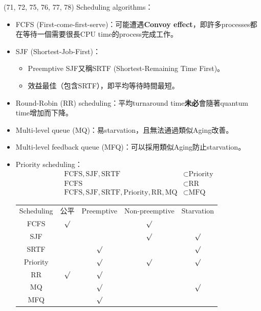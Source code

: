 \begin{theorem}{(71, 72, 75, 76, 77, 78)} Scheduling algorithms： \begin{itemize}
        \item FCFS (First-come-first-serve)：可能遭遇\textbf{Convoy effect}，即許多processes都在等待一個需要很長CPU time的process完成工作。
        \item SJF (Shortest-Job-First)：\begin{itemize}
            \item Preemptive SJF又稱SRTF (Shortest-Remaining Time First)。
            \item 效益最佳（包含SRTF），即平均等待時間最短。
        \end{itemize}
        \item Round-Robin (RR) scheduling：平均turnaround time\textbf{未必}會隨著quantum time增加而下降。
        \item Multi-level queue (MQ)：易starvation，且無法通過類似Aging改善。
        \item Multi-level feedback queue (MFQ)：可以採用類似Aging防止starvation。
        \item Priority scheduling：\begin{equation}
            \begin{aligned}
                \text{FCFS}, \text{SJF}, \text{SRTF} & \subset \text{Priority} \\
                \text{FCFS} & \subset \text{RR} \\
                \text{FCFS}, \text{SJF}, \text{SRTF}, \text{Priority}, \text{RR}, \text{MQ} & \subset \text{MFQ}
            \end{aligned}
        \end{equation}
        \begin{table}[H]
            \centering
            \begin{tabular}{|c|c|c|c|c|}
                \hline
                Scheduling & 公平 & Preemptive & Non-preemptive & Starvation \\
                \Xhline{2\arrayrulewidth}
                FCFS & $\surd$ & & $\surd$ & \\
                \hline
                SJF & & & $\surd$ & $\surd$ \\
                \hline
                SRTF & & $\surd$ & & $\surd$ \\
                \hline
                Priority & & $\surd$ & $\surd$ & $\surd$\\
                \hline
                RR & $\surd$ & $\surd$ & & \\
                \hline
                MQ & & $\surd$ & & $\surd$ \\
                \hline
                MFQ & & $\surd$ & & \\
                \hline
            \end{tabular}
        \end{table}
    \end{itemize}
\end{theorem}

